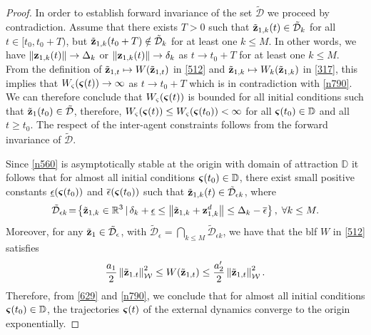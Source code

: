 \begin{proof}
	In order to establish forward invariance of the set $\mathcal{\tilde D}$ we proceed by contradiction.
	Assume that there exists $T>0$ such that $\tilde{\mathbf{z}}_{1, k}(t) \in \mathcal{\tilde D}_k$ for all $t \in [t_0,t_0+T)$, but $\tilde{\mathbf{z}}_{1, k}(t_0+T) \notin \mathcal{\tilde D}_k$ for at least one $k\leq M$.
	In other words, we have $\left\|\mathbf{z}_{1, k}(t)\right\|\rightarrow \Delta_k$ or $\left\|\mathbf{z}_{1, k}(t)\right\|\rightarrow \delta_k$ as $t\rightarrow t_0+T$ for at least one ${k\leq M}$.
	From the definition of $\tilde{\mathbf{z}}_{1, t}\mapsto W(\tilde{\mathbf{z}}_{1, t})$ in \eqref{512} and $\tilde{\mathbf{z}}_{1, k}\mapsto W_k(\tilde{\mathbf{z}}_{1, k})$ in \eqref{317}, this implies that $W_\varsigma(\bm{\varsigma}(t)) \rightarrow\infty$ as $t\rightarrow t_0+T$ which is in contradiction with \eqref{n790}.
	We can therefore conclude that $W_\varsigma(\bm{\varsigma}(t))$ is bounded for all initial conditions such that $\tilde{\mathbf{z}}_{1}(t_0)\in \mathcal{\tilde D}$, therefore, $W_\varsigma(\bm{\varsigma}(t))\leq W_\varsigma(\bm{\varsigma}(t_0)) <\infty$ for all $\bm{\varsigma}(t_0)\in\mathbb{D}$ and all $t\geq t_0$.
	The respect of the inter-agent constraints follows from the forward invariance of $\mathcal{\tilde D}$.
	
	Since \eqref{n560} is asymptotically stable at the origin with domain of attraction $\mathbb{D}$ it follows that for almost all initial conditions $\bm{\varsigma}(t_0)\in\mathbb{D}$, there exist small positive constants $\underline\epsilon(\bm{\varsigma}(t_0))$ and $\overline\epsilon(\bm{\varsigma}(t_0))$ such that $\tilde{\mathbf{z}}_{1, k}(t)\in\mathcal{\tilde D}_{\epsilon k}$, where
	\begin{equation} \label{n800}
	\mathcal{\tilde D}_{\epsilon k}\!=\!\left\{\tilde{\mathbf{z}}_{1, k}\in\mathbb{R}^{3}\,|\,\delta_k+\underline\epsilon\leq\left\|\tilde{\mathbf{z}}_{1, k}+\mathbf{z}_{1, k}^d\right\|\leq\Delta_k-\overline\epsilon\right\},\; \forall k\leq M.
	\end{equation}
	Moreover, for any $\tilde{\mathbf{z}}_{1}\in\mathcal{\tilde D}_{\epsilon}$, with $\mathcal{\tilde D}_{\epsilon}=\bigcap_{k\leq M} \mathcal{\tilde{D}}_{\epsilon k}$, we have that the \gls{blf} $W$ in \eqref{512} satisfies		
	\begin{equation}\label{629}
	\frac{a_1}{2}\left\|\tilde{\mathbf{z}}_{1. t}\right\|_{\mathcal{W}}^2\leq W(\tilde{\mathbf{z}}_{1, t})\leq \frac{a_2'}{2}\left\|\tilde{\mathbf{z}}_{1, t}\right\|_{\mathcal{W}}^2.
	\end{equation}	
	Therefore, from \eqref{629} and \eqref{n790}, we conclude that for almost all initial conditions $\bm{\varsigma}(t_0)\in\mathbb{D}$, the trajectories $\bm{\varsigma}(t)$ of the external dynamics converge to the origin exponentially.


\end{proof}
